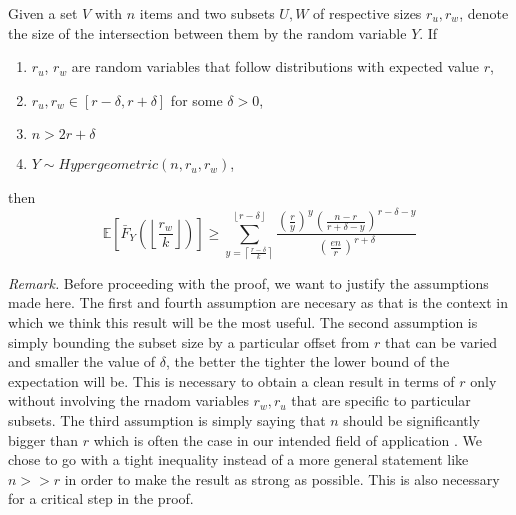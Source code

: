 \begin{lemma}
    \label{lemma:tail-expectation}
    Given a set $V$ with $n$ items and two subsets $U,W$ of respective sizes $r_u,r_w$, denote the size of the intersection between them by the random variable $Y$.
        If \begin{enumerate}
            \item $r_u$, $r_w$ are random variables that follow distributions with expected value $r$,
            \item $r_u, r_w \in [r-\delta, r+\delta]$ for some $\delta > 0$,
            \item $n > 2r + \delta$ 
            \item $Y \sim Hypergeometric(n, r_u, r_w)$,
        \end{enumerate}      
then $$\mathbb{E} \left[ \bar{F}_Y\left(\left\lfloor \frac{r_w}{k} 
\right\rfloor\right) \right] \ge \sum_{y = \left\lceil \frac{r-\delta}{k} \right\rceil}^{\left\lfloor r-\delta \right\rfloor}
\frac
{
    \left(\frac{r}{y}\right)^{y} \left(\frac{n-r}{r + \delta - y}\right)^{r-\delta-y}
}
{
    \left(\frac{en}{r}\right)^{r+\delta}
} $$
    \end{lemma}
    \textit{Remark.} Before proceeding with the proof, we want to justify the assumptions made here. The first and fourth assumption are necesary as that is the context in which we think this result will be the most useful. The second assumption is simply bounding the subset size by a particular offset from $r$ that can be varied and smaller the value of $\delta$, the better the tighter the lower bound of the expectation will be. This is necessary to obtain a clean result in terms of $r$ only without involving the rnadom variables $r_w, r_u$ that are specific to particular subsets. The third assumption is simply saying that $n$ should be significantly bigger than $r$ which is often the case in our intended field of application \cite{valiant2005memorization}. We chose to go with a tight inequality instead of a more general statement like $n >> r$ in order to make the result as strong as possible. This is also necessary for a critical step in the proof.

